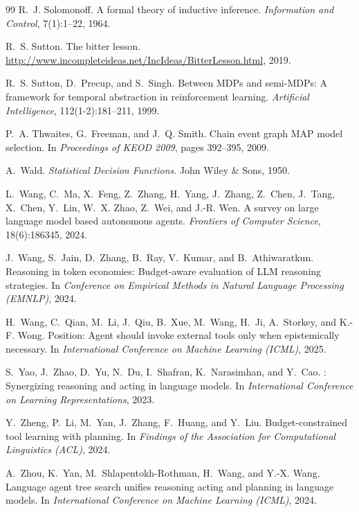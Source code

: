 \documentclass[11pt]{article}
\begin{document}
\begin{thebibliography}{99}
R.~J. Solomonoff.
\newblock A formal theory of inductive inference.
\newblock \emph{Information and Control}, 7(1):1--22, 1964.

R.~S. Sutton.
\newblock The bitter lesson.
\newblock \url{http://www.incompleteideas.net/IncIdeas/BitterLesson.html}, 2019.

R.~S. Sutton, D.~Precup, and S.~Singh.
\newblock Between {MDPs} and semi-{MDPs}: A framework for temporal abstraction in reinforcement learning.
\newblock \emph{Artificial Intelligence}, 112(1-2):181--211, 1999.

P.~A. Thwaites, G.~Freeman, and J.~Q. Smith.
\newblock Chain event graph {MAP} model selection.
\newblock In \emph{Proceedings of KEOD 2009}, pages 392--395, 2009.

A.~Wald.
\newblock \emph{Statistical Decision Functions}.
\newblock John Wiley \& Sons, 1950.

L.~Wang, C.~Ma, X.~Feng, Z.~Zhang, H.~Yang, J.~Zhang, Z.~Chen, J.~Tang, X.~Chen, Y.~Lin, W.~X. Zhao, Z.~Wei, and J.-R. Wen.
\newblock A survey on large language model based autonomous agents.
\newblock \emph{Frontiers of Computer Science}, 18(6):186345, 2024.

J.~Wang, S.~Jain, D.~Zhang, B.~Ray, V.~Kumar, and B.~Athiwaratkun.
\newblock Reasoning in token economies: Budget-aware evaluation of {LLM} reasoning strategies.
\newblock In \emph{Conference on Empirical Methods in Natural Language Processing (EMNLP)}, 2024.

H.~Wang, C.~Qian, M.~Li, J.~Qiu, B.~Xue, M.~Wang, H.~Ji, A.~Storkey, and K.-F. Wong.
\newblock Position: Agent should invoke external tools only when epistemically necessary.
\newblock In \emph{International Conference on Machine Learning (ICML)}, 2025.

S.~Yao, J.~Zhao, D.~Yu, N.~Du, I.~Shafran, K.~Narasimhan, and Y.~Cao.
: Synergizing reasoning and acting in language models.
\newblock In \emph{International Conference on Learning Representations}, 2023.

Y.~Zheng, P.~Li, M.~Yan, J.~Zhang, F.~Huang, and Y.~Liu.
\newblock Budget-constrained tool learning with planning.
\newblock In \emph{Findings of the Association for Computational Linguistics (ACL)}, 2024.

A.~Zhou, K.~Yan, M.~Shlapentokh-Rothman, H.~Wang, and Y.-X. Wang.
\newblock Language agent tree search unifies reasoning acting and planning in language models.
\newblock In \emph{International Conference on Machine Learning (ICML)}, 2024.

\end{thebibliography}
\end{document}
